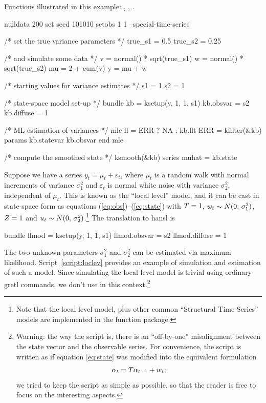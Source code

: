 Functions illustrated in this example: , ,
.

\begin{script}[htbp]
  \label{script:loclev}
\begin{scode}
nulldata 200
set seed 101010
setobs 1 1 --special-time-series

/* set the true variance parameters */
true_s1 = 0.5
true_s2 = 0.25

/* and simulate some data */
v = normal() * sqrt(true_s1)
w = normal() * sqrt(true_s2)
mu = 2 + cum(v)
y = mu + w

/* starting values for variance estimates */
s1 = 1
s2 = 1

/* state-space model set-up */
bundle kb = ksetup(y, 1, 1, s1)
kb.obsvar = s2
kb.diffuse = 1

/* ML estimation of variances */
mle ll = ERR ? NA : kb.llt
    ERR = kfilter(&kb)
    params kb.statevar kb.obsvar
end mle

/* compute the smoothed state */
ksmooth(&kb)
series muhat = kb.state
\end{scode}
\end{script}

Suppose we have a series $y_t = \mu_t + \varepsilon_t$, where $\mu_t$
is a random walk with normal increments of variance $\sigma^2_1$ and
$\varepsilon_t$ is normal white noise with variance $\sigma^2_2$,
independent of $\mu_t$. This is known as the ``local level'' model,
and it can be cast in state-space form as equations
(\ref{eq:obs})--(\ref{eq:state}) with $T = 1$, $w_t \sim
N(0,\, \sigma^2_1)$, $Z = 1$ and $u_t \sim N(0,\,
\sigma^2_2)$.\footnote{Note that the local level model, plus other
  common ``Structural Time Series'' models are implemented in the
   function package.} The translation to \textsf{hansl}
is
\begin{code}
bundle llmod = ksetup(y, 1, 1, s1)
llmod.obsvar = s2
llmod.diffuse = 1
\end{code}

The two unknown parameters $\sigma^2_1$ and $\sigma^2_2$ can be
estimated via maximum likelihood.  Script~\ref{script:loclev} provides
an example of simulation and estimation of such a model. Since
simulating the local level model is trivial using ordinary gretl
commands, we don't use  in this context.\footnote{Warning:
  the way the script is, there is an ``off-by-one'' misalignment
  between the state vector and the observable series. For convenience,
  the script is written as if equation \eqref{eq:state} was modified
  into the equivalent formulation
  \[
  \alpha_{t} = T \alpha_{t-1} + w_t ;
  \]
  we tried to keep the script as simple as possible, so that the
  reader is free to focus on the interesting aspects.}

